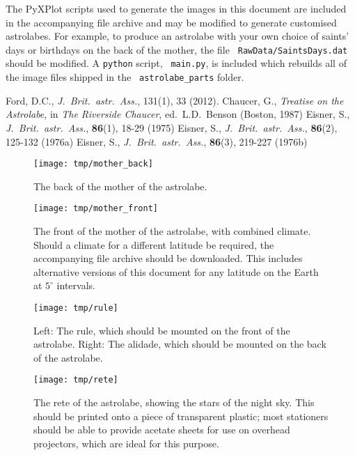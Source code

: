 \documentclass[a4paper,onecolumn,10pt]{article}
\begin{document}
The PyXPlot scripts used to generate the images in this document are included
in the accompanying file archive and may be modified to generate customised
astrolabes. For example, to produce an astrolabe with your own choice of
saints' days or birthdays on the back of the mother, the file {\tt
Raw\-Data/\-Saints\-Days\-.dat} should be modified. A {\tt python} script, {\tt
main.py}, is included which rebuilds all of the image files shipped in the {\tt
astrolabe\_parts} folder.

\begin{thebibliography}{9}
Ford, D.C., \textit{J.\ Brit.\ astr.\ Ass.}, 131(1), 33 (2012).
Chaucer, G., \textit{Treatise on the Astrolabe}, in {\it The Riverside Chaucer}, ed.\ L.D.\ Benson (Boston, 1987)
Eisner, S., \textit{J.\ Brit.\ astr.\ Ass.}, \textbf{86}(1), 18-29 (1975)
Eisner, S., \textit{J.\ Brit.\ astr.\ Ass.}, \textbf{86}(2), 125-132 (1976a)
Eisner, S., \textit{J.\ Brit.\ astr.\ Ass.}, \textbf{86}(3), 219-227 (1976b)
\end{thebibliography}

\newpage

\begin{figure}
\centerline{\texttt{[image: tmp/mother\_back]}}
\caption{The back of the mother of the astrolabe.}
\label{mother_back}
\end{figure}

\begin{figure}
\centerline{\texttt{[image: tmp/mother\_front]}}
\caption{The front of the mother of the astrolabe, with combined climate.
Should a climate for a different latitude be required, the accompanying file archive should be downloaded. This includes alternative versions of this document for any latitude on the Earth at $5^\circ$ intervals.}
\label{mother_front}
\end{figure}

\begin{figure}
\centerline{\texttt{[image: tmp/rule]}}
\caption{Left: The rule, which should be mounted on the front of the astrolabe. Right: The alidade, which should be mounted on the back of the astrolabe.}
\label{rule}
\end{figure}

\begin{figure}
\centerline{\texttt{[image: tmp/rete]}}
\caption{The rete of the astrolabe, showing the stars of the night sky. This should be printed onto a piece of transparent plastic; most stationers should be able to provide acetate sheets for use on overhead projectors, which are ideal for this purpose.}
\label{rete}
\end{figure}
\end{document}
